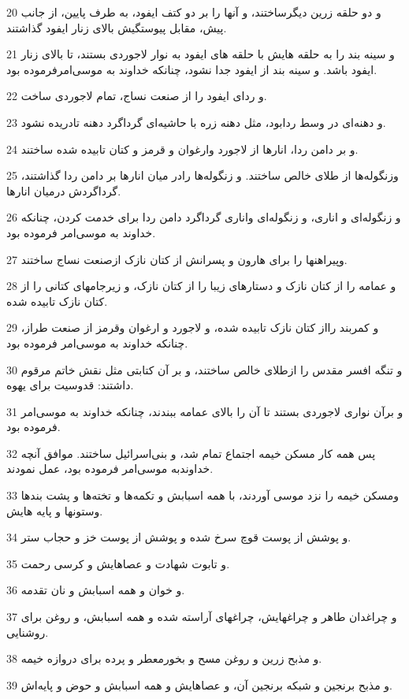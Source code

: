 \par 20 و دو حلقه زرین دیگرساختند، و آنها را بر دو کتف ایفود، به طرف پایین، از جانب پیش، مقابل پیوستگیش بالای زنار ایفود گذاشتند.
\par 21 و سینه بند را به حلقه هایش با حلقه های ایفود به نوار لاجوردی بستند، تا بالای زنار ایفود باشد. و سینه بند از ایفود جدا نشود، چنانکه خداوند به موسی‌امرفرموده بود.
\par 22 و ردای ایفود را از صنعت نساج، تمام لاجوردی ساخت.
\par 23 و دهنه‌ای در وسط ردابود، مثل دهنه زره با حاشیه‌ای گرداگرد دهنه تادریده نشود.
\par 24 و بر دامن ردا، انارها از لاجورد وارغوان و قرمز و کتان تابیده شده ساختند.
\par 25 وزنگوله‌ها از طلای خالص ساختند. و زنگوله‌ها رادر میان انارها بر دامن ردا گذاشتند، گرداگردش درمیان انارها.
\par 26 و زنگوله‌ای و اناری، و زنگوله‌ای واناری گرداگرد دامن ردا برای خدمت کردن، چنانکه خداوند به موسی‌امر فرموده بود.
\par 27 وپیراهنها را برای هارون و پسرانش از کتان نازک ازصنعت نساج ساختند.
\par 28 و عمامه را از کتان نازک و دستارهای زیبا را از کتان نازک، و زیرجامهای کتانی را از کتان نازک تابیده شده.
\par 29 و کمربند رااز کتان نازک تابیده شده، و لاجورد و ارغوان وقرمز از صنعت طراز، چنانکه خداوند به موسی‌امر فرموده بود.
\par 30 و تنگه افسر مقدس را ازطلای خالص ساختند، و بر آن کتابتی مثل نقش خاتم مرقوم داشتند: قدوسیت برای یهوه.
\par 31 و برآن نواری لاجوردی بستند تا آن را بالای عمامه ببندند، چنانکه خداوند به موسی‌امر فرموده بود.
\par 32 پس همه کار مسکن خیمه اجتماع تمام شد، و بنی‌اسرائیل ساختند. موافق آنچه خداوندبه موسی‌امر فرموده بود، عمل نمودند.
\par 33 ومسکن خیمه را نزد موسی آوردند، با همه اسبابش و تکمه‌ها و تخته‌ها و پشت بندها وستونها و پایه هایش.
\par 34 و پوشش از پوست قوچ سرخ شده و پوشش از پوست خز و حجاب ستر.
\par 35 و تابوت شهادت و عصاهایش و کرسی رحمت.
\par 36 و خوان و همه اسبابش و نان تقدمه.
\par 37 و چراغدان طاهر و چراغهایش، چراغهای آراسته شده و همه اسبابش، و روغن برای روشنایی.
\par 38 و مذبح زرین و روغن مسح و بخورمعطر و پرده برای دروازه خیمه.
\par 39 و مذبح برنجین و شبکه برنجین آن، و عصاهایش و همه اسبابش و حوض و پایه‌اش.
